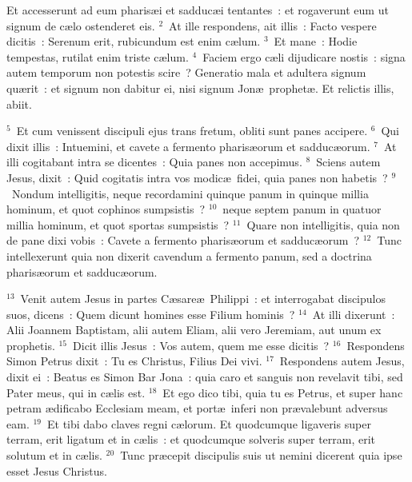 \lettrine[lines=10,image=true,loversize=0.05,lraise=-0.03]{E}{}t accesserunt ad eum pharis\ae i et sadduc\ae i tentantes~: et rogaverunt eum ut signum de c\ae lo ostenderet eis.
${}^{2}$~At ille respondens, ait illis~: Facto vespere dicitis~: Serenum erit, rubicundum est enim c\ae lum.
${}^{3}$~Et mane~: Hodie tempestas, rutilat enim triste c\ae lum.
${}^{4}$~Faciem ergo c\ae li dijudicare nostis~: signa autem temporum non potestis scire~? Generatio mala et adultera signum qu\ae rit~: et signum non dabitur ei, nisi signum Jon\ae\ prophet\ae . Et relictis illis, abiit.


${}^{5}$~Et cum venissent discipuli ejus trans fretum, obliti sunt panes accipere.
${}^{6}$~Qui dixit illis~: Intuemini, et cavete a fermento pharis\ae orum et sadduc\ae orum.
${}^{7}$~At illi cogitabant intra se dicentes~: Quia panes non accepimus.
${}^{8}$~Sciens autem Jesus, dixit~: Quid cogitatis intra vos modic\ae\ fidei, quia panes non habetis~?
${}^{9}$~Nondum intelligitis, neque recordamini quinque panum in quinque millia hominum, et quot cophinos sumpsistis~?
${}^{10}$~neque septem panum in quatuor millia hominum, et quot sportas sumpsistis~?
${}^{11}$~Quare non intelligitis, quia non de pane dixi vobis~: Cavete a fermento pharis\ae orum et sadduc\ae orum~?
${}^{12}$~Tunc intellexerunt quia non dixerit cavendum a fermento panum, sed a doctrina pharis\ae orum et sadduc\ae orum.


${}^{13}$~Venit autem Jesus in partes C\ae sare\ae\ Philippi~: et interrogabat discipulos suos, dicens~: Quem dicunt homines esse Filium hominis~?
${}^{14}$~At illi dixerunt~: Alii Joannem Baptistam, alii autem Eliam, alii vero Jeremiam, aut unum ex prophetis.
${}^{15}$~Dicit illis Jesus~: Vos autem, quem me esse dicitis~?
${}^{16}$~Respondens Simon Petrus dixit~: Tu es Christus, Filius Dei vivi.
${}^{17}$~Respondens autem Jesus, dixit ei~: Beatus es Simon Bar Jona~: quia caro et sanguis non revelavit tibi, sed Pater meus, qui in c\ae lis est.
${}^{18}$~Et ego dico tibi, quia tu es Petrus, et super hanc petram \ae dificabo Ecclesiam meam, et port\ae\ inferi non pr\ae valebunt adversus eam.
${}^{19}$~Et tibi dabo claves regni c\ae lorum. Et quodcumque ligaveris super terram, erit ligatum et in c\ae lis~: et quodcumque solveris super terram, erit solutum et in c\ae lis.
${}^{20}$~Tunc pr\ae cepit discipulis suis ut nemini dicerent quia ipse esset Jesus Christus.


